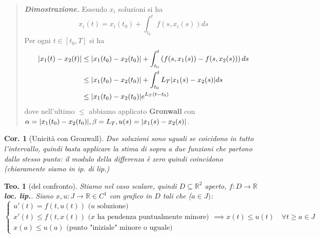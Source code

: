 \documentclass[a4paper,10pt]{article}
\newcommand{\re}{\mathbb{R}} %
\theoremstyle{indentdefinition}
\theoremstyle{indenttheorem}
\newtheorem{thm}{Teo.}
\newtheorem{cor}{Cor.}
\theoremstyle{myremark}
\theoremstyle{indentgeneral}
\newenvironment{dimo}{\begin{quote}\textit{\textbf{Dimostrazione.}}}{\end{quote}} %
\begin{document}
\begin{dimo}
    Essendo $x_i$ soluzioni si ha
    $$x_i(t)=x_i(t_0)+\int_{t_0}^tf(s,x_i(s))ds$$
    Per ogni $t\in [t_0, T]$ si ha
    \begin{align*}
         \abs{x_1(t)-x_2(t)} &\le \abs{x_1(t_0)-x_2(t_0)}+\int_{t_0}^t\left(f(s,x_1(s))-f(s,x_2(s))\right)ds \\
         &\le \abs{x_1(t_0)-x_2(t_0)}+\int_{t_0}^tL_T \abs{x_1(s)-x_2(s)}ds \\
         &\le  \abs{x_1(t_0)-x_2(t_0)}e^{L_T(t-t_0)}
    \end{align*}
     dove nell'ultimo $\le$ abbiamo applicato \textbf{Gronwall} con $\alpha=\abs{x_1(t_0)-x_2(t_0)}, \beta=L_T, u(s)=\abs{x_1(s)-x_2(s)}$.
   
\end{dimo}

\begin{cor}[Unicità con  Gronwall]
    Due soluzioni sono uguali se coicidono in tutto  l'intervallo, quindi basta applicare la stima di sopra a due funzioni che  partono dallo stesso punto: il modulo della differenza  è  zero quindi coincidono (chiaramente siamo in ip. di lip.)
\end{cor}

\begin{thm}[del confronto]
    Stiamo nel caso scalare, quindi $D\subseteq\re^2$ aperto, $f:D\to\re$ \textbf{loc. lip.}. Siano $x,u:J\to\re\in C^1$ con grafico in $D$ tali che ($a\in J)$:
    $$\begin{cases}
        u'(t)=f(t,u(t)) \text{ ($u$ soluzione)} \\
        x'(t)\le f(t,x(t)) \text{ ($x$ ha pendenza puntualmente minore)} \\
        x(a)\le u(a) \text{ (punto "iniziale" minore o uguale)}
       
    \end{cases}
     \implies x(t)\le u(t) \quad\forall  t\ge a \in J$$
\end{thm}
\end{document}
